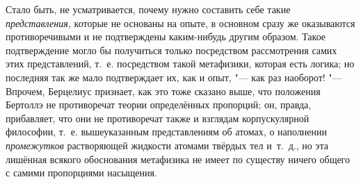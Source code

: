 Стало быть, не усматривается, почему нужно составить себе такие
{\em представления,} которые не основаны на опыте, в основном сразу же
оказываются противоречивыми и не подтверждены каким-нибудь другим образом.
Такое подтверждение могло бы получиться только посредством рассмотрения самих
этих представлений, т.~е. посредством такой метафизики, которая есть логика; но
последняя так же мало подтверждает их, как и опыт, "--- как раз наоборот! "---
Впрочем, Берцелиус признает, как это тоже сказано выше, что положения Бертоллэ
не противоречат теории определённых пропорций; он, правда, прибавляет, что они
не противоречат также и взглядам корпускулярной философии, т.~е. вышеуказанным
представлениям об атомах, о наполнении {\em промежутков} растворяющей жидкости
атомами твёрдых тел и~т.~д., но эта лишённая всякого обоснования метафизика не
имеет по существу ничего общего с самими пропорциями насыщения.

